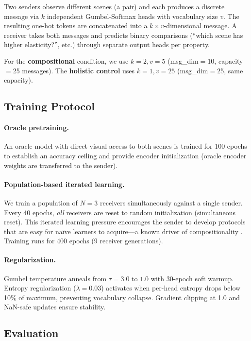 \documentclass[11pt,a4paper]{article}
\begin{document}
Two senders observe different scenes (a pair) and each produces a discrete message via $k$ independent Gumbel-Softmax heads with vocabulary size $v$.
The resulting one-hot tokens are concatenated into a $k \times v$-dimensional message.
A receiver takes both messages and predicts binary comparisons (``which scene has higher elasticity?'', etc.) through separate output heads per property.

For the \textbf{compositional} condition, we use $k{=}2, v{=}5$ (msg\_dim$=$10, capacity$=$25 messages).
The \textbf{holistic control} uses $k{=}1, v{=}25$ (msg\_dim$=$25, same capacity).

\subsection{Training Protocol}

\paragraph{Oracle pretraining.}
An oracle model with direct visual access to both scenes is trained for 100 epochs to establish an accuracy ceiling and provide encoder initialization (oracle encoder weights are transferred to the sender).

\paragraph{Population-based iterated learning.}
We train a population of $N{=}3$ receivers simultaneously against a single sender.
Every 40 epochs, \emph{all} receivers are reset to random initialization (simultaneous reset).
This iterated learning pressure encourages the sender to develop protocols that are easy for na\"ive learners to acquire---a known driver of compositionality \citep{kirby2015compression,ren2020compositional}.
Training runs for 400 epochs (9 receiver generations).

\paragraph{Regularization.}
Gumbel temperature anneals from $\tau{=}3.0$ to $1.0$ with 30-epoch soft warmup.
Entropy regularization ($\lambda{=}0.03$) activates when per-head entropy drops below 10\% of maximum, preventing vocabulary collapse.
Gradient clipping at 1.0 and NaN-safe updates ensure stability.

\subsection{Evaluation}
\end{document}
